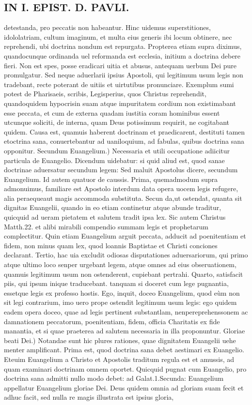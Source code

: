 \documentclass{article}
\begin{document}
\begin{pages}
\section*{IN I. EPIST. D. PAVLI. }
\marginpar{[ p.29 ]}\pstart detestanda, pro peccatis non habeantur. Hinc uidemus superstitiones, idololatriam, cultum imaginum, et multa eius generis ibi locum obtinere, nec reprehendi, ubi doctrina nondum est repurgata. Propterea etiam supra diximus, quandocunque  ordinanda uel reformanda est ecclesia, initium a doctrina debere fieri. Non est spes, posse eradicari uitia et abusus, antequam uerbum Dei pure promulgatur. Sed neque aduerlarii ipsius Apostoli, qui legitimum usum legis non tradebant, recte poterant de uitiis et uirtutibus pronunciare. Exemplum sumi potest de Pharisaeis, scribis, Legisperius, quos Christus reprehendit, quandoquidem hypocrisin suam atque impuritatem cordium non existimabant esse peccata, et cum de externa quadam iustitia coram hominibus essent utcunque  soliciti, de interna, quam Deus potissimum requirit, ne cogitabant quidem. Causa est, quamuis haberent doctrinam et praedicarent, destituti tamen etoctrina sana, conuertebantur ad uaniloquium, ad fabulas, quibus doctrina sana opponitur.  \pend\pstart Secundum Euangelium.) Necessaria et utili occupatione adiicitur particula de Euangelio. Dicendum uidebatur: si quid aliud est, quod sanae doctrinae aduersatur secundum legem: Sed maluit Apostolus dicere, secundum Euangelium. Id autem quatuor de caussis. Prima, quemadmodum supra admonuimus, familiare est Apostolo interdum data opera uocem legis refugere, alia peraequeaut magis accommoda substituta. Secun da,ut ostendat, quanta sit dignitas Euangelii, quando in eo etiam continetur atque  abunde traditur, quicquid ad ueram pietatem et salutem tradit ipsa lex. Sic autem Christus Matth.22. et alibi mirabili compendio summam legis et prophetarum complectitur. Quin etiam Euangelium arguit peccata, adducit ad poenitentiam et fidem, non minus quam lex, quod loannis Baptistae et Christi conciones declarant. Tertio, hac uia excludit odiosas disputationes aduersariorum, qui primo atque ultimo loco senper urgebant legem, atque omnes ad eius obseruationem, quamuis legitimum usum non ostenderent, cupiebant pertrahi. Quarto, satisfacit piis, qui ipsum inique traducebant. tanquam si doceret cum lege pugnantia, essetque  legis ex professo hostis. Ego, inquit, doceo Euangelium, quod eùm non sit legi contrarium, imo uero prope ostendit legitimum usum legis: ego quidem eadem opera doceo, quae ad legis pertinent substantlam, nenpereprehenssonem ac damnationem peccatorum, poenitentiam, fidem, officia Charitatis ex fide manantia, et si quae praeterea ad salutem necessaria in illa proponuntur.  \pend\pstart Gloriae beati Dei.) Notandae sunt hic plures rationes, quae dignitatem Euangelii uehe menter amplificant. Prima est, quod doctrina sana debet aestimari ex Euangelio. Eteuim Euangelium a Christo et Apostolis traditum regula est et amussis, ad quam examinari doctrinam omnem oportet. Quicquid pugnat cum Euangelio, pro doctrina sana admitti nullo modo debet: ad Galat.1.Secunda: Euangelium appellatur Euangelium gloriae Dei. Deus quidem omnia ad gloriam suam fecit et adhuc facit, sed nulla re magis illustrata est ipsius gloria, 
\end{pages}
\end{document}
